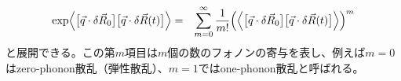 \documentclass[a4j]{jsarticle}
\begin{document}
\begin{eqnarray}
	{\rm exp}
	\Big\langle \big[ \vec{q} \cdot \delta \vec{R}_{0} \big] \big[ \vec{q} \cdot \delta \vec{R}(t) \big] \Big\rangle
	&=&
	\sum_{m=0}^{\infty}
	\dfrac{1}{m!}
	\Big( \Big\langle \big[ \vec{q} \cdot \delta \vec{R}_{0} \big] \big[ \vec{q} \cdot \delta \vec{R}(t) \big] \Big\rangle \Big)^{m}
\end{eqnarray}
と展開できる。この第$m$項目は$m$個の数のフォノンの寄与を表し、例えば$m=0$はzero-phonon散乱（弾性散乱）、$m=1$ではone-phonon散乱と呼ばれる。
\end{document}
